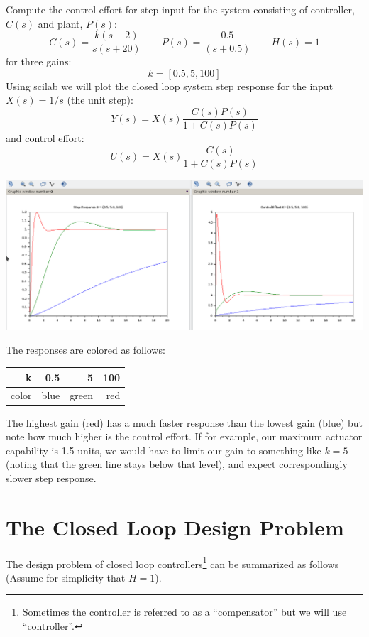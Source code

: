 \begin{Example}
Compute the control effort for step input for the system consisting of controller, $C(s)$ and plant, $P(s)$:
\[
C(s) = \frac  {k(s+2)}  {s(s+20)}  \qquad P(s) = \frac   {0.5}  {(s+0.5)} \qquad H(s) = 1
\]
for three gains:
\[
k = [0.5, 5, 100]
\]
Using scilab we will plot the closed loop system step response for the input $X(s) = 1/s$ (the unit step):
\[
Y(s) = X(s) \frac  {C(s)P(s)}  {1+C(s)P(s)}
\]
and control effort:
\[
U(s) = X(s)\frac {C(s)}  {1+C(s)P(s)}
\]

\begin{centering}
\includegraphics[width=6.25in]{figs09/step_ctl_effort_scilab.png}
\end{centering}

The responses are colored as follows:
\begin{tabular}{r|r|r|r}
k     &  0.5 & 5   & 100 \\
\hline
color & blue & green & red \\
\end{tabular}

The highest gain (red) has a much faster response than the lowest gain (blue) but note how much higher is the
control effort.   If for example, our maximum actuator capability is 1.5 units, we would have to limit our gain to
something like $k=5$ (noting that the green line stays below that level), and expect correspondingly slower step response.
\end{Example}




\section{The Closed Loop Design Problem}

The design problem of closed loop controllers\footnote{Sometimes the controller is referred to as a ``compensator'' but we will use ``controller''.} can be summarized as follows (Assume
for simplicity that $H=1$).

